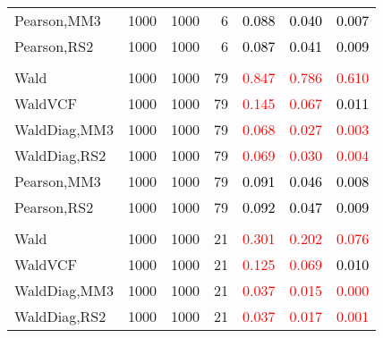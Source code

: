 \documentclass[
]{article}
\begin{document}
\begin{table}[H]
{\begin{tabular}[t]{lrrrrrr}
\hspace{1em}Pearson,MM3 & 1000 & 1000 & 6 & \textcolor{black}{0.088} & \textcolor{black}{0.040} & \textcolor{black}{0.007}\\
\hspace{1em}Pearson,RS2 & 1000 & 1000 & 6 & \textcolor{black}{0.087} & \textcolor{black}{0.041} & \textcolor{black}{0.009}\\
\addlinespace[0.3em]
\multicolumn{7}{l}{\textbf{1F 15V}}\\
\hspace{1em}Wald & 1000 & 1000 & 79 & \textcolor{red}{0.847} & \textcolor{red}{0.786} & \textcolor{red}{0.610}\\
\hspace{1em}WaldVCF & 1000 & 1000 & 79 & \textcolor{red}{0.145} & \textcolor{red}{0.067} & \textcolor{black}{0.011}\\
\hspace{1em}WaldDiag,MM3 & 1000 & 1000 & 79 & \textcolor{red}{0.068} & \textcolor{red}{0.027} & \textcolor{red}{0.003}\\
\hspace{1em}WaldDiag,RS2 & 1000 & 1000 & 79 & \textcolor{red}{0.069} & \textcolor{red}{0.030} & \textcolor{red}{0.004}\\
\hspace{1em}Pearson,MM3 & 1000 & 1000 & 79 & \textcolor{black}{0.091} & \textcolor{black}{0.046} & \textcolor{black}{0.008}\\
\hspace{1em}Pearson,RS2 & 1000 & 1000 & 79 & \textcolor{black}{0.092} & \textcolor{black}{0.047} & \textcolor{black}{0.009}\\
\addlinespace[0.3em]
\multicolumn{7}{l}{\textbf{2F 10V}}\\
\hspace{1em}Wald & 1000 & 1000 & 21 & \textcolor{red}{0.301} & \textcolor{red}{0.202} & \textcolor{red}{0.076}\\
\hspace{1em}WaldVCF & 1000 & 1000 & 21 & \textcolor{red}{0.125} & \textcolor{red}{0.069} & \textcolor{black}{0.010}\\
\hspace{1em}WaldDiag,MM3 & 1000 & 1000 & 21 & \textcolor{red}{0.037} & \textcolor{red}{0.015} & \textcolor{red}{0.000}\\
\hspace{1em}WaldDiag,RS2 & 1000 & 1000 & 21 & \textcolor{red}{0.037} & \textcolor{red}{0.017} & \textcolor{red}{0.001}\\

\end{tabular}}
\end{table}
\end{document}
